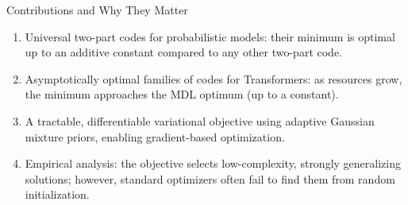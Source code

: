 \documentclass{beamer}
\begin{document}
\begin{frame}{Contributions and Why They Matter}
\small
\begin{enumerate}
    \item Universal two-part codes for probabilistic models: their minimum is optimal up to an additive constant compared to any other two-part code.
    \item Asymptotically optimal families of codes for Transformers: as resources grow, the minimum approaches the MDL optimum (up to a constant).
    \item A tractable, differentiable variational objective using adaptive Gaussian mixture priors, enabling gradient-based optimization.
    \item Empirical analysis: the objective selects low-complexity, strongly generalizing solutions; however, standard optimizers often fail to find them from random initialization.
\end{enumerate}
\end{frame}
\end{document}
